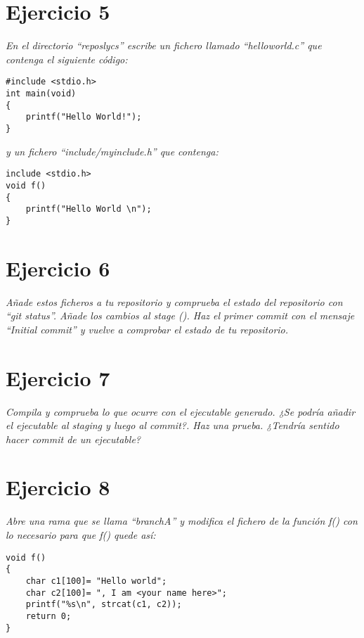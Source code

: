 \section{Ejercicio 5}
\begin{center}
    \parbox{12cm}{\justify\textit{
        En el directorio ``reposlycs'' escribe un fichero llamado “helloworld.c” que contenga el siguiente código:
    }}
\end{center}

\begin{lstlisting}[style=CStyle,xleftmargin=.3\textwidth]
#include <stdio.h>
int main(void)
{
    printf("Hello World!"); 
}\end{lstlisting}
    
\begin{center}
    \parbox{12cm}{\justify\textit{
        y un fichero ``include/myinclude.h'' que contenga:
    }}
\end{center}

\begin{lstlisting}[style=CStyle,xleftmargin=.3\textwidth]
include <stdio.h>
void f()
{
    printf("Hello World \n");
}\end{lstlisting}

\section{Ejercicio 6}
\begin{center}
    \parbox{12cm}{\justify\textit{
        Añade estos ficheros a tu repositorio y comprueba el estado del repositorio con “git status”. Añade los cambios al stage (). Haz el primer commit con el mensaje ``Initial commit'' y vuelve a comprobar el estado de tu repositorio.
    }}
\end{center}

\section{Ejercicio 7}
\begin{center}
    \parbox{12cm}{\justify\textit{
        Compila y comprueba lo que ocurre con el ejecutable generado. ¿Se podría añadir el ejecutable al staging y luego al commit?. Haz una prueba. ¿Tendría sentido hacer commit de un ejecutable?
    }}
\end{center}

\section{Ejercicio 8}
\begin{center}
    \parbox{12cm}{\justify\textit{
        Abre una rama que se llama ``branchA'' y modifica el fichero de la función f() con lo necesario para que f() quede así:
    }}
\begin{lstlisting}[style=CStyle,xleftmargin=.3\textwidth]
void f()
{
    char c1[100]= "Hello world";
    char c2[100]= ", I am <your name here>";
    printf("%s\n", strcat(c1, c2));
    return 0;
}\end{lstlisting}
\end{center}

